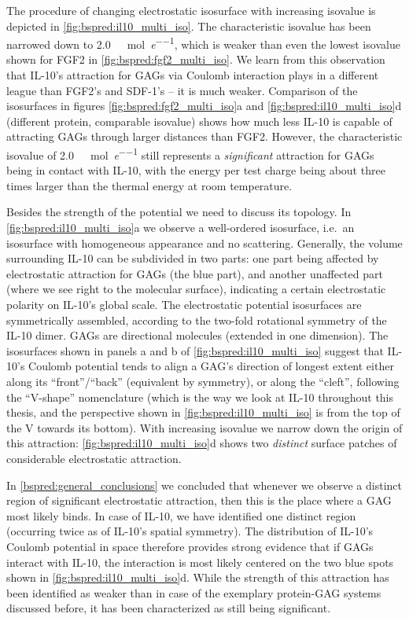 The procedure of changing electrostatic isosurface with increasing isovalue is
depicted in \cref{fig:bspred:il10_multi_iso}. The characteristic isovalue has
been narrowed down to \SI{2.0}{\kilo\calory\per\mole\per\elementarycharge},
which is weaker than even the lowest isovalue shown for FGF2 in
\cref{fig:bspred:fgf2_multi_iso}. We learn from this observation that IL-10's
attraction for GAGs via Coulomb interaction plays in a different league than
FGF2's and SDF-1's -- it is much weaker. Comparison of the isosurfaces in
figures \ref{fig:bspred:fgf2_multi_iso}a and \ref{fig:bspred:il10_multi_iso}d
(different protein, comparable isovalue) shows how much less IL-10 is capable of
attracting GAGs through larger distances than FGF2. However, the characteristic
isovalue of \SI{2.0}{\kilo\calory\per\mole\per\elementarycharge} still
represents a \textit{significant} attraction for GAGs being in contact with
IL-10, with the energy per test charge being about three times larger than the
thermal energy at room temperature.

Besides the strength of the potential we need to discuss its topology. In
\cref{fig:bspred:il10_multi_iso}a we observe a well-ordered isosurface, i.e.\ an
isosurface with homogeneous appearance and no scattering. Generally, the volume
surrounding IL-10 can be subdivided in two parts: one part being affected by
electrostatic attraction for GAGs (the blue part), and another unaffected part
(where we see right to the molecular surface), indicating a certain
electrostatic polarity on IL-10's global scale. The electrostatic potential
isosurfaces are symmetrically assembled, according to the two-fold rotational
symmetry of the IL-10 dimer. GAGs are directional molecules (extended in one
dimension). The isosurfaces shown in panels a and b of
\cref{fig:bspred:il10_multi_iso} suggest that IL-10's Coulomb potential tends to
align a GAG's direction of longest extent either along its
\enquote{front}/\enquote{back} (equivalent by symmetry), or along the
\enquote{cleft}, following the \enquote{V-shape} nomenclature (which is the way
we look at IL-10 throughout this thesis, and the perspective shown in
\cref{fig:bspred:il10_multi_iso} is from the top of the V towards its bottom).
With increasing isovalue we narrow down the origin of this attraction:
\cref{fig:bspred:il10_multi_iso}d shows two \textit{distinct} surface patches of
considerable electrostatic attraction.

In \cref{bspred:general_conclusions} we concluded that whenever we observe a
distinct region of significant electrostatic attraction, then this is the place
where a GAG most likely binds. In case of IL-10, we have identified one distinct
region (occurring twice as of IL-10's spatial symmetry). The distribution of
IL-10's Coulomb potential in space therefore provides strong evidence that if
GAGs interact with IL-10, the interaction is most likely centered on the two
blue spots shown in \cref{fig:bspred:il10_multi_iso}d. While the strength of
this attraction has been identified as weaker than in case of the exemplary
protein-GAG systems discussed before, it has been characterized as still being
significant.


